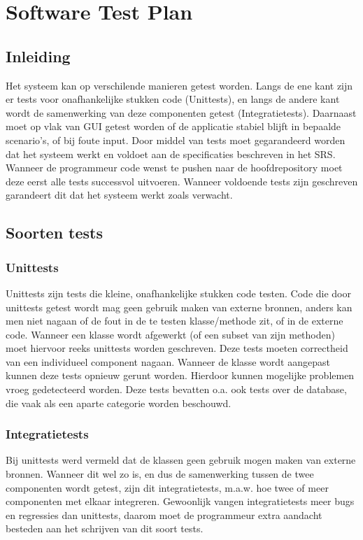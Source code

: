 \chapter{Software Test Plan}
\section{Inleiding}
Het systeem kan op verschilende manieren getest worden. 
Langs de ene kant zijn er tests voor onafhankelijke stukken code (Unittests), en langs de andere kant wordt de samenwerking van deze componenten getest (Integratietests). 
Daarnaast moet op vlak van GUI getest worden of de applicatie stabiel blijft in bepaalde scenario's, of bij foute input. 
Door middel van tests moet gegarandeerd worden dat het systeem werkt en voldoet aan de specificaties beschreven in het SRS\cite{srs}. 
Wanneer de programmeur code wenst te pushen naar de hoofdrepository moet deze eerst alle tests successvol uitvoeren. 
Wanneer voldoende tests zijn geschreven garandeert dit dat het systeem werkt zoals verwacht.

\section{Soorten tests}

\subsection{Unittests}
Unittests zijn tests die kleine, onafhankelijke stukken code testen. Code die door unittests getest wordt mag geen gebruik maken van externe bronnen, anders kan men niet nagaan of de fout in de te testen klasse/methode zit, of in de externe code.
Wanneer een klasse wordt afgewerkt (of een subset van zijn methoden) moet hiervoor reeks unittests worden geschreven. 
Deze tests moeten correctheid van een individueel component nagaan. 
Wanneer de klasse wordt aangepast kunnen deze tests opnieuw gerunt worden. Hierdoor kunnen mogelijke problemen vroeg gedetecteerd worden.
Deze tests bevatten o.a. ook tests over de database, die vaak als een aparte categorie worden beschouwd. 

\subsection{Integratietests}
Bij unittests werd vermeld dat de klassen geen gebruik mogen maken van externe bronnen. Wanneer dit wel zo is, en dus de samenwerking tussen de twee componenten wordt getest, zijn dit integratietests, m.a.w. hoe twee of meer componenten met elkaar integreren. 
Gewoonlijk vangen integratietests meer bugs en regressies dan unittests, daarom moet de programmeur extra aandacht besteden aan het schrijven van dit soort tests.

